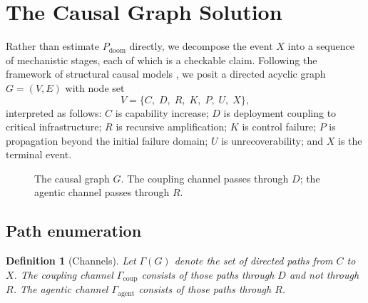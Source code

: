 \documentclass[11pt]{article}
\newtheorem{definition}{Definition}[section]
\theoremstyle{remark}
\newcommand{\PD}{P_{\mathrm{doom}}}
\begin{document}
\section{The Causal Graph Solution}\label{sec:causal}

Rather than estimate $\PD$ directly, we decompose the event $X$ into a sequence of mechanistic stages, each of which is a checkable claim. Following the framework of structural causal models \cite{pearl2009}, we posit a directed acyclic graph $G=(V,E)$ with node set
\[
V=\{C,\;D,\;R,\;K,\;P,\;U,\;X\},
\]
interpreted as follows: $C$ is capability increase; $D$ is deployment coupling to critical infrastructure; $R$ is recursive amplification; $K$ is control failure; $P$ is propagation beyond the initial failure domain; $U$ is unrecoverability; and $X$ is the terminal event.

\begin{figure}[h]
\centering
{}
\caption{The causal graph $G$. The coupling channel passes through $D$; the agentic channel passes through $R$.}\label{fig:graph}
\end{figure}

\subsection{Path enumeration}

\begin{definition}[Channels]\label{def:channels}
Let $\Gamma(G)$ denote the set of directed paths from $C$ to $X$. The \emph{coupling channel} $\Gamma_{\mathrm{coup}}$ consists of those paths through $D$ and not through $R$. The \emph{agentic channel} $\Gamma_{\mathrm{agent}}$ consists of those paths through $R$.
\end{definition}
\end{document}
